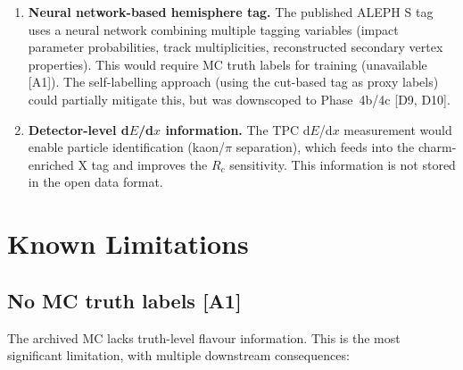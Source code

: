 \documentclass[11pt,a4paper]{article}
\begin{document}
\begin{enumerate}
\item \textbf{Neural network-based hemisphere tag.} The published ALEPH S
tag~\cite{ALEPH:Rb:1996} uses a neural network combining multiple tagging variables
(impact parameter probabilities, track multiplicities, reconstructed secondary vertex
properties). This would require MC truth labels for training (unavailable [A1]). The
self-labelling approach (using the cut-based tag as proxy labels) could partially
mitigate this, but was downscoped to Phase~4b/4c [D9, D10].

\item \textbf{Detector-level d$E$/d$x$ information.} The TPC d$E$/d$x$ measurement
would enable particle identification (kaon/$\pi$ separation), which feeds into the
charm-enriched X tag and improves the $R_c$ sensitivity. This information is not
stored in the open data format.
\end{enumerate}

\FloatBarrier
{}
\section{Known Limitations}
\label{sec:limitations}

\subsection{No MC truth labels [A1]}

The archived MC lacks truth-level flavour information. This is the most significant
limitation, with multiple downstream consequences:
\end{document}
